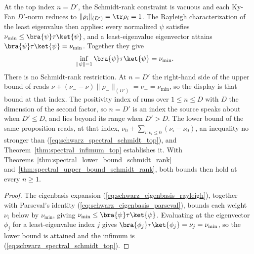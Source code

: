 \begin{theorem}
    \label{thm:spectral_bound_schmidt_rank_top}
    \leanok
    At the top index $n=D'$, the Schmidt-rank constraint is vacuous and each
    Ky-Fan $D'$-norm reduces to $\|\rho_i\|_{(D')}=\tr\rho_i=1$. The Rayleigh
    characterization of the least eigenvalue then applies: every normalized
    $\psi$ satisfies $\nu_{\min}\le\bra{\psi}\tau\ket{\psi}$, and a
    least-eigenvalue eigenvector attains
    $\bra{\psi}\tau\ket{\psi}=\nu_{\min}$. Together they give
    \begin{align}
        \inf_{\|\psi\|=1}\bra{\psi}\tau\ket{\psi}
         & =\nu_{\min}.
        \label{eq:schwarz_spectral_schmidt_top}
    \end{align}
    There is no Schmidt-rank restriction. At $n=D'$ the right-hand side of the
    upper bound of \cite[Chapter~3, Proposition~3.2]{Wolf2012Quantum} reads
    $\nu+(\nu_--\nu)\|\rho_-\|_{(D')}=\nu_-=\nu_{\min}$, so the display is that
    bound at that index. The positivity index of
    \cite[Chapter~3, Proposition~3.1]{Wolf2012Quantum} runs over $1\le n\le D$
    with $D$ the dimension of the second factor, so $n=D'$ is an index the
    source speaks about when $D'\le D$, and lies beyond its range when $D'>D$.
    The lower bound of the same proposition reads, at that index,
    $\nu_0+\sum_{i:\nu_i\le0}(\nu_i-\nu_0)$, an inequality no stronger than
    (\ref{eq:schwarz_spectral_schmidt_top}), and
    Theorem~\ref{thm:spectral_infimum_top} establishes it. With
    Theorems~\ref{thm:spectral_lower_bound_schmidt_rank}
    and~\ref{thm:spectral_upper_bound_schmidt_rank}, both bounds then hold at
    every $n\ge1$.
\end{theorem}

\begin{proof}
    \leanok
    The eigenbasis expansion (\ref{eq:schwarz_eigenbasis_rayleigh}), together
    with Parseval's identity (\ref{eq:schwarz_eigenbasis_parseval}), bounds
    each weight $\nu_i$ below by $\nu_{\min}$, giving
    $\nu_{\min}\le\bra{\psi}\tau\ket{\psi}$. Evaluating at the eigenvector
    $\phi_j$ for a least-eigenvalue index $j$ gives
    $\bra{\phi_j}\tau\ket{\phi_j}=\nu_j=\nu_{\min}$, so the lower bound is
    attained and the infimum is (\ref{eq:schwarz_spectral_schmidt_top}).
\end{proof}

